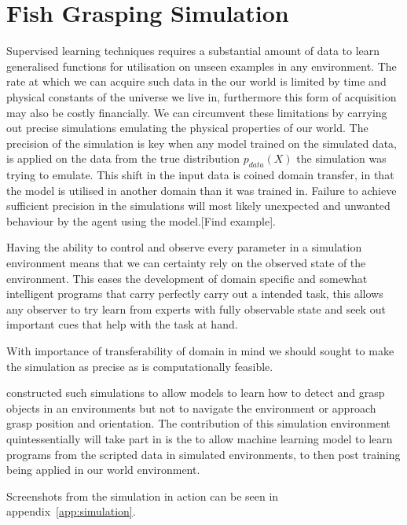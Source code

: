 \section{Fish Grasping Simulation}\label{sec:simulation}

Supervised learning techniques requires a substantial amount of data to learn generalised functions for utilisation on unseen examples in any environment. The rate at which we can acquire such data in the our world is limited by time and physical constants of the universe we live in, furthermore this form of acquisition may also be costly financially. We can circumvent these limitations by carrying out precise simulations emulating the physical properties of our world. The precision of the simulation is key when any model trained on the simulated data, is applied on the data from the true distribution $p_{data}(X)$ the simulation was trying to emulate. This shift in the input data is coined domain transfer, in that the model is utilised in another domain than it was trained in. Failure to achieve sufficient precision in the simulations will most likely unexpected and unwanted behaviour by the agent using the model.[Find example]. 

Having the ability to control and observe every parameter in a simulation environment means that we can certainty rely on the observed state of the environment. This eases the development of domain specific and somewhat intelligent programs that carry perfectly carry out a intended task, this allows any observer to try learn from experts with fully observable state and seek out important cues that help with the task at hand.   

With importance of transferability of domain in mind we should sought to make the simulation as precise as is computationally feasible.

\cite{Dyrstad2016} constructed such simulations to allow models to learn how to detect and grasp objects in an environments but not to navigate the environment or approach grasp position and orientation. The contribution of this simulation environment quintessentially will take part in is the to allow machine learning model to learn programs from the scripted data in simulated environments, to then post training being applied in our world environment.

Screenshots from the simulation in action can be seen in appendix~\ref{app:simulation}.






